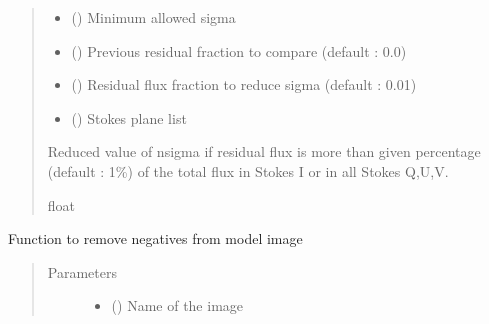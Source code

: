\documentclass[letterpaper,10pt,english]{sphinxmanual}
\begin{document}
\begin{fulllineitems}
\begin{fulllineitems}
\begin{quote}
\begin{description}
\begin{itemize}
\item {} 
\sphinxAtStartPar
{} () \textendash{} Minimum allowed sigma

\item {} 
\sphinxAtStartPar
{} () \textendash{} Previous residual fraction to compare (default : 0.0)

\item {} 
\sphinxAtStartPar
{} () \textendash{} Residual flux fraction to reduce sigma (default : 0.01)

\item {} 
\sphinxAtStartPar
{} () \textendash{} Stokes plane list

\end{itemize}

\item[{Returns}] \leavevmode
\sphinxAtStartPar
Reduced value of n\sphinxhyphen{}sigma if residual flux is more than given percentage (default : 1\%) of the total flux in Stokes I or in all Stokes Q,U,V.

\item[{Return type}] \leavevmode
\sphinxAtStartPar
float

\end{description}\end{quote}

\end{fulllineitems}


\begin{fulllineitems}
\label{\detokenize{paircars:paircars.intensity_selfcal_LTS.IntensitySelfcal.remove_model_negative}}
\sphinxAtStartPar
Function to remove negatives from model image
\begin{quote}\begin{description}
\item[{Parameters}] \leavevmode\begin{itemize}
\item {} 
\sphinxAtStartPar
{} () \textendash{} Name of the image


\end{itemize}
\end{description}
\end{quote}
\end{fulllineitems}
\end{fulllineitems}
\end{document}

